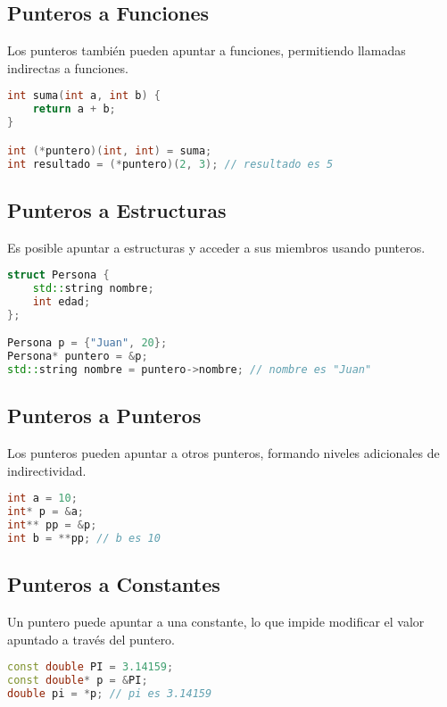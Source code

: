 \subsection{Punteros a Funciones}

Los punteros también pueden apuntar a funciones, permitiendo llamadas indirectas a funciones.

\begin{lstlisting}[language=C++]
int suma(int a, int b) {
    return a + b;
}

int (*puntero)(int, int) = suma;
int resultado = (*puntero)(2, 3); // resultado es 5
\end{lstlisting}

\subsection{Punteros a Estructuras}

Es posible apuntar a estructuras y acceder a sus miembros usando punteros.

\begin{lstlisting}[language=C++]
struct Persona {
    std::string nombre;
    int edad;
};

Persona p = {"Juan", 20};
Persona* puntero = &p;
std::string nombre = puntero->nombre; // nombre es "Juan"
\end{lstlisting}

\subsection{Punteros a Punteros}

Los punteros pueden apuntar a otros punteros, formando niveles adicionales de indirectividad.

\begin{lstlisting}[language=C++]
int a = 10;
int* p = &a;
int** pp = &p;
int b = **pp; // b es 10
\end{lstlisting}

\subsection{Punteros a Constantes}

Un puntero puede apuntar a una constante, lo que impide modificar el valor apuntado a través del puntero.

\begin{lstlisting}[language=C++]
const double PI = 3.14159;
const double* p = &PI;
double pi = *p; // pi es 3.14159
\end{lstlisting}


